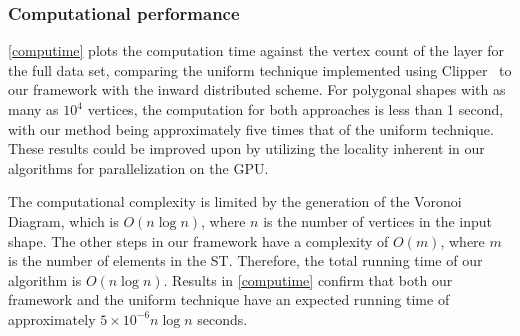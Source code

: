 \subsubsection{Computational performance}
\cref{computime} plots the computation time against the vertex count of the layer for the full data set, comparing the uniform technique implemented using Clipper~\cite{johnson2014clipper} to our framework with the inward distributed scheme.
For polygonal shapes with as many as $10^4$ vertices, the computation for both approaches is less than 1 second, with our method being approximately five times that of the uniform technique.
These results could be improved upon by utilizing the locality inherent in our algorithms for parallelization on the GPU.

The computational complexity is limited by the generation of the Voronoi Diagram, which is $O(n \log n)$, where $n$ is the number of vertices in the input shape.
The other steps in our framework have a complexity of $O(m)$, where $m$ is the number of elements in the ST.
Therefore, the total running time of our algorithm is $O(n \log n)$.
Results in \cref{computime} confirm that both our framework and the uniform technique have an expected running time of approximately $5 \times 10^{-6} n \log n$ seconds.





